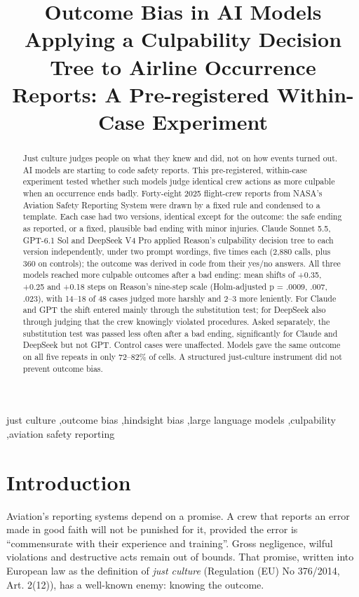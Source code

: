 \documentclass[review,12pt]{elsarticle}
\begin{document}
\begin{frontmatter}
\title{Outcome Bias in AI Models Applying a Culpability Decision Tree to Airline Occurrence Reports: A Pre-registered Within-Case Experiment}
\begin{abstract}
Just culture judges people on what they knew and did, not on how events turned out. AI models are starting to code safety reports. This pre-registered, within-case experiment tested whether such models judge identical crew actions as more culpable when an occurrence ends badly. Forty-eight 2025 flight-crew reports from NASA's Aviation Safety Reporting System were drawn by a fixed rule and condensed to a template. Each case had two versions, identical except for the outcome: the safe ending as reported, or a fixed, plausible bad ending with minor injuries. Claude Sonnet 5.5, GPT-6.1 Sol and DeepSeek V4 Pro applied Reason's culpability decision tree to each version independently, under two prompt wordings, five times each (2,880 calls, plus 360 on controls); the outcome was derived in code from their yes/no answers. All three models reached more culpable outcomes after a bad ending: mean shifts of +0.35, +0.25 and +0.18 steps on Reason's nine-step scale (Holm-adjusted p = .0009, .007, .023), with 14--18 of 48 cases judged more harshly and 2--3 more leniently. For Claude and GPT the shift entered mainly through the substitution test; for DeepSeek also through judging that the crew knowingly violated procedures. Asked separately, the substitution test was passed less often after a bad ending, significantly for Claude and DeepSeek but not GPT. Control cases were unaffected. Models gave the same outcome on all five repeats in only 72--82\% of cells. A structured just-culture instrument did not prevent outcome bias.
\end{abstract}
\begin{keyword}
just culture \sep outcome bias \sep hindsight bias \sep large language models \sep culpability \sep aviation safety reporting
\end{keyword}
\end{frontmatter}
\linenumbers
\setlength{\emergencystretch}{2em}

\hypertarget{introduction}{%
\section{Introduction}\label{introduction}}

Aviation's reporting systems depend on a promise. A crew that reports an error made in good faith will not be punished for it, provided the error is ``commensurate with their experience and training''. Gross negligence, wilful violations and destructive acts remain out of bounds. That promise, written into European law as the definition of \emph{just culture} (Regulation (EU) No 376/2014, Art. 2(12)), has a well-known enemy: knowing the outcome.
\end{document}
